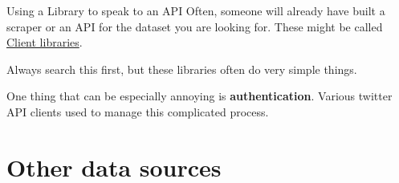 \documentclass[
  10pt,
  ignorenonframetext,
  aspectratio=169]{beamer}
\begin{document}
\begin{frame}{Using a Library to speak to an API}
\protect\hypertarget{using-a-library-to-speak-to-an-api}{}
Often, someone will already have built a scraper or an API for the
dataset you are looking for. These might be called
\href{https://docs.openalex.org/api\#client-libraries}{Client
libraries}.

Always search this first, but these libraries often do very simple
things.

One thing that can be especially annoying is \textbf{authentication}.
Various twitter API clients used to manage this complicated process.
\end{frame}

\hypertarget{other-data-sources}{%
\section{Other data sources}\label{other-data-sources}}
\end{document}
